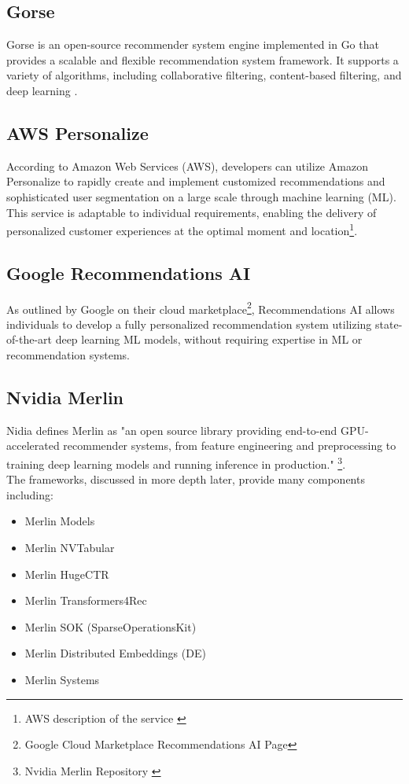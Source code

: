 \subsection{Gorse}
Gorse \cite{Gorse} is an open-source recommender system engine implemented in Go that provides a scalable and flexible recommendation system framework. It supports a variety of algorithms, including collaborative filtering, content-based filtering, and deep learning \cite{Rexy}.

\subsection{AWS Personalize}
According to Amazon Web Services (AWS), developers can utilize Amazon Personalize \cite{AWSPersonalize} to rapidly create and implement customized recommendations and sophisticated user segmentation on a large scale through machine learning (ML). This service is adaptable to individual requirements, enabling the delivery of personalized customer experiences at the optimal moment and location\footnote{AWS description of the service \cite{AWSPersonalize} }. \\

\subsection{Google Recommendations AI}
As outlined by Google on their cloud marketplace\footnote{Google Cloud Marketplace Recommendations AI Page\cite{GoogleMarketplaceRecAi}}, Recommendations AI \cite{GoogleRecommendationsAI} allows individuals to develop a fully personalized recommendation system utilizing state-of-the-art deep learning ML models, without requiring expertise in ML or recommendation systems. \\

\subsection{Nvidia Merlin}

Nidia defines Merlin \cite{NvidiaMerlin} as "an open source library providing end-to-end GPU-accelerated recommender systems, from feature engineering and preprocessing to training deep learning models and running inference in production." \footnote{Nvidia Merlin Repository \cite{NvidiaMerlinRepo}}. 
\\The frameworks, discussed in more depth later, provide many components including:
\begin{itemize}
    \item Merlin Models \cite{MerlinModels}
    \item Merlin NVTabular \cite{MerlinNVTabular}
    \item Merlin HugeCTR \cite{MerlinHugeCTR}
    \item Merlin Transformers4Rec \cite{MerlinTransformer4Rec}
    \item Merlin SOK (SparseOperationsKit)
    \item Merlin Distributed Embeddings (DE)
    \item Merlin Systems \cite{MerlinSystemsRepo}
\end{itemize}

